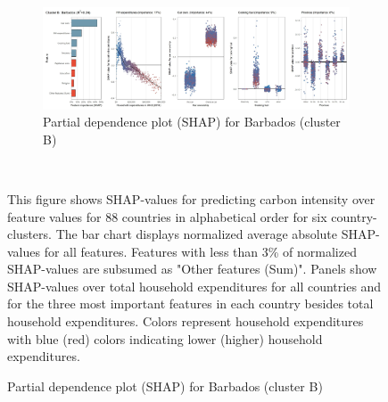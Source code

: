 \begin{figure}[ht!]
    \vspace{0.5cm}
   \begin{subfigure}[b]{\textwidth}
         \centering
         \caption{Partial dependence plot (SHAP) for Barbados (cluster B)}
         \label{fig:5b_BRB}
         \includegraphics[width=\textwidth]{Figure 5b/Figure_5b_BRB}
         \end{subfigure}
    \\
    \vspace{0.5cm}
   
    \begin{subcaption2}
     This figure shows SHAP-values for predicting carbon intensity over feature values for 88 countries in alphabetical order for six country-clusters. The bar chart displays normalized average absolute SHAP-values for all features. Features with less than 3\% of normalized SHAP-values are subsumed as "Other features (Sum)". Panels show SHAP-values over total household expenditures for all countries and for the three most important features in each country besides total household expenditures. Colors represent household expenditures with blue (red) colors indicating lower (higher) household expenditures.
     \end{subcaption2}
\end{figure}

